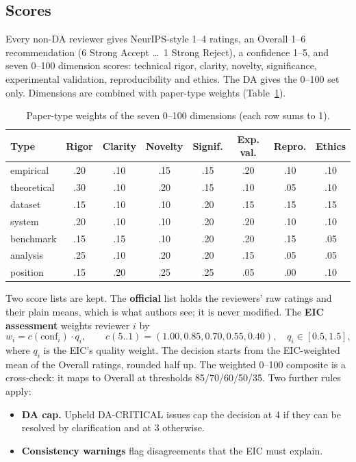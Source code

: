 \documentclass[11pt,a4paper]{article}
\begin{document}
\subsection{Scores}
Every non-DA reviewer gives NeurIPS-style 1--4 ratings, an Overall 1--6 recommendation (6 Strong
Accept \dots\ 1 Strong Reject), a confidence 1--5, and seven 0--100 dimension scores: technical
rigor, clarity, novelty, significance, experimental validation, reproducibility and ethics. The DA
gives the 0--100 set only. Dimensions are combined with paper-type weights
(Table~\ref{tab:weights}).

\begin{table}[t]
\centering\small
\caption{Paper-type weights of the seven 0--100 dimensions (each row sums to 1).}
\label{tab:weights}
\begin{tabular}{lccccccc}
\toprule
Type & Rigor & Clarity & Novelty & Signif. & Exp. val. & Repro. & Ethics\\
\midrule
empirical   & .20 & .10 & .15 & .15 & .20 & .10 & .10\\
theoretical & .30 & .10 & .20 & .15 & .10 & .05 & .10\\
dataset     & .15 & .10 & .10 & .20 & .15 & .15 & .15\\
system      & .20 & .10 & .10 & .20 & .20 & .10 & .10\\
benchmark   & .15 & .15 & .10 & .20 & .20 & .15 & .05\\
analysis    & .25 & .10 & .20 & .20 & .15 & .05 & .05\\
position    & .15 & .20 & .25 & .25 & .05 & .00 & .10\\
\bottomrule
\end{tabular}
\end{table}

Two score lists are kept. The \textbf{official} list holds the reviewers' raw ratings and their
plain means, which is what authors see; it is never modified. The \textbf{EIC assessment} weights
reviewer $i$ by
\begin{equation}
w_i = c(\text{conf}_i)\cdot q_i,\qquad c(5..1) = (1.00, 0.85, 0.70, 0.55, 0.40),\quad q_i\in[0.5,1.5],
\end{equation}
where $q_i$ is the EIC's quality weight. The decision starts from the EIC-weighted mean of the
Overall ratings, rounded half up. The weighted 0--100 composite is a cross-check: it maps to
Overall at thresholds 85/70/60/50/35. Two further rules apply:
\begin{itemize}
\item \textbf{DA cap.} Upheld DA-CRITICAL issues cap the decision at 4 if they can be resolved by
clarification and at 3 otherwise.
\item \textbf{Consistency warnings} flag disagreements that the EIC must explain.
\end{itemize}
\end{document}
